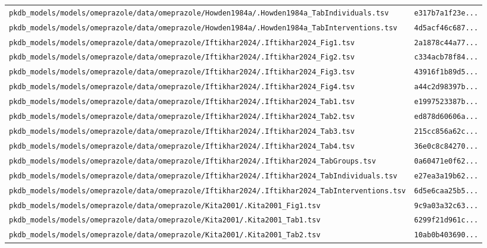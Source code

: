 \documentclass{article}
\begin{document}
\begin{longtable}{ll}
\texttt{pkdb\_models/models/omeprazole/data/omeprazole/Howden1984a/.Howden1984a\_TabIndividuals.tsv} & \texttt{e317b7a1f23e...} \\
\texttt{pkdb\_models/models/omeprazole/data/omeprazole/Howden1984a/.Howden1984a\_TabInterventions.tsv} & \texttt{4d5acf46c687...} \\
\texttt{pkdb\_models/models/omeprazole/data/omeprazole/Iftikhar2024/.Iftikhar2024\_Fig1.tsv} & \texttt{2a1878c44a77...} \\
\texttt{pkdb\_models/models/omeprazole/data/omeprazole/Iftikhar2024/.Iftikhar2024\_Fig2.tsv} & \texttt{c334acb78f84...} \\
\texttt{pkdb\_models/models/omeprazole/data/omeprazole/Iftikhar2024/.Iftikhar2024\_Fig3.tsv} & \texttt{43916f1b89d5...} \\
\texttt{pkdb\_models/models/omeprazole/data/omeprazole/Iftikhar2024/.Iftikhar2024\_Fig4.tsv} & \texttt{a44c2d98397b...} \\
\texttt{pkdb\_models/models/omeprazole/data/omeprazole/Iftikhar2024/.Iftikhar2024\_Tab1.tsv} & \texttt{e1997523387b...} \\
\texttt{pkdb\_models/models/omeprazole/data/omeprazole/Iftikhar2024/.Iftikhar2024\_Tab2.tsv} & \texttt{ed878d60606a...} \\
\texttt{pkdb\_models/models/omeprazole/data/omeprazole/Iftikhar2024/.Iftikhar2024\_Tab3.tsv} & \texttt{215cc856a62c...} \\
\texttt{pkdb\_models/models/omeprazole/data/omeprazole/Iftikhar2024/.Iftikhar2024\_Tab4.tsv} & \texttt{36e0c8c84270...} \\
\texttt{pkdb\_models/models/omeprazole/data/omeprazole/Iftikhar2024/.Iftikhar2024\_TabGroups.tsv} & \texttt{0a60471e0f62...} \\
\texttt{pkdb\_models/models/omeprazole/data/omeprazole/Iftikhar2024/.Iftikhar2024\_TabIndividuals.tsv} & \texttt{e27ea3a19b62...} \\
\texttt{pkdb\_models/models/omeprazole/data/omeprazole/Iftikhar2024/.Iftikhar2024\_TabInterventions.tsv} & \texttt{6d5e6caa25b5...} \\
\texttt{pkdb\_models/models/omeprazole/data/omeprazole/Kita2001/.Kita2001\_Fig1.tsv} & \texttt{9c9a03a32c63...} \\
\texttt{pkdb\_models/models/omeprazole/data/omeprazole/Kita2001/.Kita2001\_Tab1.tsv} & \texttt{6299f21d961c...} \\
\texttt{pkdb\_models/models/omeprazole/data/omeprazole/Kita2001/.Kita2001\_Tab2.tsv} & \texttt{10ab0b403690...} \\

\end{longtable}
\end{document}
